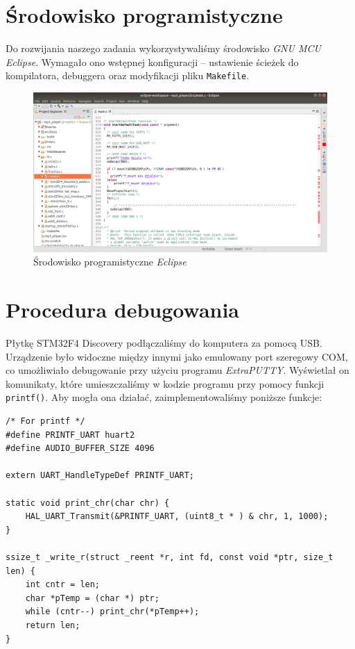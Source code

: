 \documentclass[12pt,a4paper]{article}
\begin{document}
\section{Środowisko programistyczne}
Do rozwijania naszego zadania wykorzystywaliśmy środowisko \emph{GNU MCU Eclipse}. Wymagało ono wstępnej konfiguracji -- ustawienie ścieżek do kompilatora, debuggera oraz modyfikacji pliku \texttt{Makefile}.

\begin{figure}[H]
 \centerline{\includegraphics[width=\textwidth]{img/img6}}
 \caption{Środowisko programistyczne \emph{Eclipse}}
 \label{img6}
\end{figure}

\section{Procedura debugowania}
Płytkę STM32F4 Discovery podłączaliśmy do komputera za pomocą USB. Urządzenie było widoczne między innymi jako emulowany port szeregowy COM, co umożliwiało debugowanie przy użyciu programu \emph{ExtraPUTTY}. Wyświetlał on komunikaty, które umieszczaliśmy w kodzie programu przy pomocy funkcji \texttt{printf()}. Aby mogła ona działać, zaimplementowaliśmy poniższe funkcje:

\begin{lstlisting}
/* For printf */
#define PRINTF_UART huart2
#define AUDIO_BUFFER_SIZE 4096

extern UART_HandleTypeDef PRINTF_UART;

static void print_chr(char chr) {
    HAL_UART_Transmit(&PRINTF_UART, (uint8_t * ) & chr, 1, 1000);
}

ssize_t _write_r(struct _reent *r, int fd, const void *ptr, size_t len) {
    int cntr = len;
    char *pTemp = (char *) ptr;
    while (cntr--) print_chr(*pTemp++);
    return len;
}
\end{lstlisting}
\end{document}
